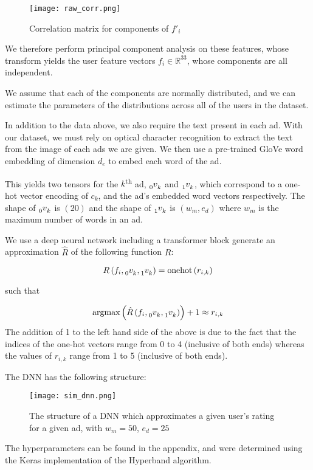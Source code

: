 \begin{figure}[H]
    \centering
    \texttt{[image: raw\_corr.png]}
    \caption{Correlation matrix for components of $f'_i$}
\end{figure}

We therefore perform principal component analysis on these features, whose transform yields the user feature vectors $f_i\in \mathbb{R}^{33}$, whose components are all independent.

We assume that each of the components are normally distributed, and we can estimate the parameters of the distributions across all of the users in the dataset.

In addition to the data above, we also require the text present in each ad. With our dataset, we must rely on optical character recognition to extract the text from the image of each ads we are given. We then use a pre-trained GloVe\cite{glove} word embedding of dimension $d_e$ to embed each word of the ad.

This yields two tensors for the $k$\textsuperscript{th} ad, $\tensor*[_0]{v}{_k}$ and $\tensor*[_1]{v}{_k}$, which correspond to a one-hot vector encoding of $c_k$, and the ad's embedded word vectors respectively. The shape of $\tensor*[_0]{v}{_k}$ is $(20)$ and the shape of $\tensor*[_1]{v}{_k}$ is $(w_m, e_d)$ where $w_m$ is the maximum number of words in an ad.

We use a deep neural network including a transformer block\cite{transformer} generate an approximation $\hat{R}$ of the following function $R$:

\begin{equation*}
    R\left(f_i, \tensor*[_0]{v}{_k}, \tensor*[_1]{v}{_k}\right) = \textrm{onehot}\left(r_{i,k}\right)
\end{equation*}

such that

\begin{equation*}
    \textrm{argmax}\left(\hat{R}\left(f_i, \tensor*[_0]{v}{_k}, \tensor*[_1]{v}{_k}\right)\right) + 1 \approx r_{i,k}
\end{equation*}
The addition of 1 to the left hand side of the above is due to the fact that the indices of the one-hot vectors range from 0 to 4 (inclusive of both ends) whereas the values of $r_{i,k}$ range from 1 to 5 (inclusive of both ends).

The DNN has the following structure:

\begin{figure}[H]
    \centering
    \texttt{[image: sim\_dnn.png]}
    \caption{The structure of a DNN which approximates a given user's rating for a given ad, with $w_m=50$, $e_d=25$}
\end{figure}

The hyperparameters can be found in the appendix, and were determined using the Keras\cite{keras} implementation of the Hyperband algorithm\cite{hyperband}.
